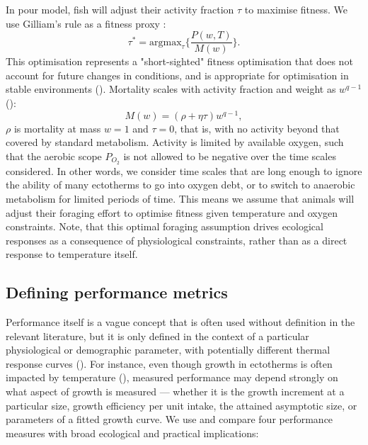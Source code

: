 \documentclass[11pt]{article}\usepackage[]{graphicx}\usepackage[]{color}
\begin{document}


In pour model, fish will adjust their activity fraction $\tau$ to maximise fitness. We use Gilliam's rule as a fitness proxy \cite{gilliam_habitat_1987}:
\begin{equation}
  \tau^* = \text{argmax}_{\tau} \{ \frac{P(w,T)}{M(w)} \}.
\end{equation}
This optimisation represents a "short-sighted" fitness optimisation that does not account for future changes in conditions, and is appropriate for optimisation in stable environments (\cite{sainmont_effective_2015}).  Mortality scales with activity fraction and weight as $w^{q-1}$ (\cite{andersen_how_2009, hartvig_food_2011}):
\begin{equation}
  \label{eq:M}
  M(w) = (\rho+\eta\tau) w^{q-1},
\end{equation}
$\rho$ is mortality at mass $w=1$ and $\tau=0$, that is, with no activity beyond that covered by standard metabolism.  Activity is limited by available oxygen, such that the aerobic scope $P_{O_2}$ is not allowed to be negative over the time scales considered. In other words, we consider time scales that are long enough to ignore the ability of many ectotherms to go into oxygen debt, or to switch to anaerobic metabolism for limited periods of time. This means we assume that animals will adjust their foraging effort to optimise fitness given temperature and oxygen constraints. Note, that this optimal foraging assumption drives ecological responses as a consequence of physiological constraints, rather than as a direct response to temperature itself.

\subsection*{Defining performance metrics}

Performance itself is a vague concept that is often used without definition in the relevant literature, but it is only defined in the context of a particular physiological or demographic parameter, with potentially different thermal response curves (\cite{jutfelt_oxygen-and_2018}). For instance, even though growth in ectotherms is often impacted by temperature (\cite{angilletta_temperature_2004}), measured performance may depend strongly on what aspect of growth is measured --- whether it is the growth increment at a particular size, growth efficiency per unit intake, the attained asymptotic size, or parameters of a fitted growth curve. We use and compare four performance measures with broad ecological and practical implications:
\end{document}
